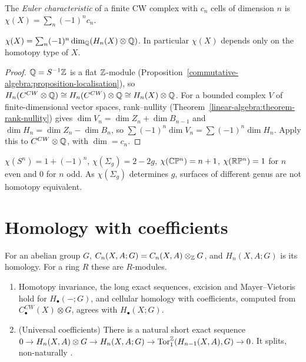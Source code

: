 \begin{definition}\label{singular-homology:definition-euler-characteristic}
The \emph{Euler characteristic} of a finite CW complex with $c_n$ cells of dimension $n$ is $\chi(X) = \sum_n (-1)^nc_n$.
\end{definition}

\begin{proposition}\label{singular-homology:proposition-euler-characteristic}
$\chi(X) = \sum_n (-1)^n\dim_{\mathbb{Q}}(H_n(X) \otimes \mathbb{Q})$. In particular $\chi(X)$ depends only on the homotopy type of $X$.
\end{proposition}

\begin{proof}
$\mathbb{Q} = S^{-1}\mathbb{Z}$ is a flat $\mathbb{Z}$-module (Proposition~\ref{commutative-algebra:proposition-localisation}), so $H_n(C^{CW} \otimes \mathbb{Q}) \cong H_n(C^{CW}) \otimes \mathbb{Q} \cong H_n(X) \otimes \mathbb{Q}$.
For a bounded complex $V$ of finite-dimensional vector spaces, rank--nullity (Theorem~\ref{linear-algebra:theorem-rank-nullity}) gives
$\dim V_n = \dim Z_n + \dim B_{n-1}$ and $\dim H_n = \dim Z_n - \dim B_n$, so $\sum(-1)^n\dim V_n = \sum(-1)^n\dim H_n$. Apply this to $C^{CW} \otimes \mathbb{Q}$, with $\dim = c_n$.
\end{proof}

\begin{example}\label{singular-homology:example-euler}
$\chi(S^n) = 1 + (-1)^n$, $\chi(\Sigma_g) = 2 - 2g$, $\chi(\mathbb{C}\mathbb{P}^n) = n + 1$, $\chi(\mathbb{R}\mathbb{P}^n) = 1$ for $n$ even and $0$ for $n$ odd. As $\chi(\Sigma_g)$ determines $g$, surfaces of
different genus are not homotopy equivalent.
\end{example}

\section{Homology with coefficients}\label{singular-homology:section-coefficients}

\begin{definition}\label{singular-homology:definition-coefficients}
For an abelian group $G$, $C_n(X, A; G) = C_n(X, A) \otimes_{\mathbb{Z}} G$, and $H_n(X, A; G)$ is its homology. For a ring $R$ these are $R$-modules.
\end{definition}

\begin{theorem}\label{singular-homology:theorem-coefficients}
\begin{enumerate}
\item Homotopy invariance, the long exact sequences, excision and Mayer--Vietoris hold for $H_\bullet(-; G)$, and cellular homology with coefficients, computed from
$C^{CW}_\bullet(X) \otimes G$, agrees with $H_\bullet(X; G)$.
\item (Universal coefficients) There is a natural short exact sequence
$0 \to H_n(X, A) \otimes G \to H_n(X, A; G) \to \operatorname{Tor}_1^{\mathbb{Z}}(H_{n-1}(X, A), G) \to 0$. It splits, non-naturally \cite[Theorem 3A.3]{hatcher-at}.
\end{enumerate}
\end{theorem}

